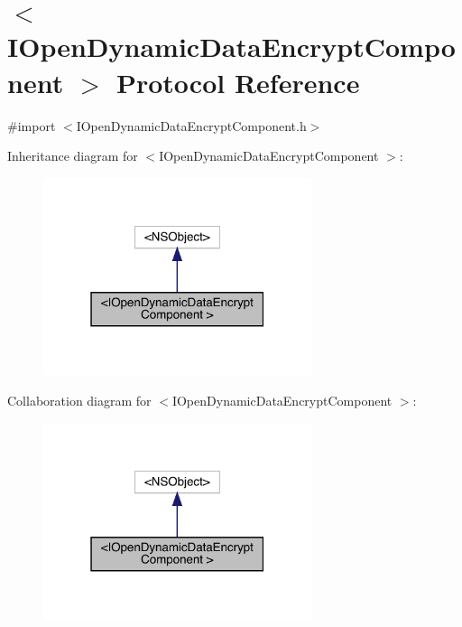 \hypertarget{protocol_i_open_dynamic_data_encrypt_component_01-p}{}\section{$<$I\+Open\+Dynamic\+Data\+Encrypt\+Component $>$ Protocol Reference}
\label{protocol_i_open_dynamic_data_encrypt_component_01-p}


{\ttfamily \#import $<$I\+Open\+Dynamic\+Data\+Encrypt\+Component.\+h$>$}



Inheritance diagram for $<$I\+Open\+Dynamic\+Data\+Encrypt\+Component $>$\+:\nopagebreak
\begin{figure}[H]
\begin{center}
\leavevmode
\includegraphics[width=223pt]{protocol_i_open_dynamic_data_encrypt_component_01-p__inherit__graph}
\end{center}
\end{figure}


Collaboration diagram for $<$I\+Open\+Dynamic\+Data\+Encrypt\+Component $>$\+:\nopagebreak
\begin{figure}[H]
\begin{center}
\leavevmode
\includegraphics[width=223pt]{protocol_i_open_dynamic_data_encrypt_component_01-p__coll__graph}
\end{center}
\end{figure}
